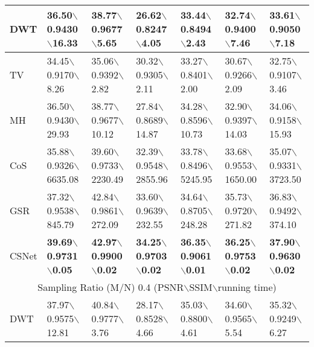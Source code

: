 \documentclass[5pt]{article}
\begin{document}
\begin{table*}[t]
\begin{tabular}{|l|l|l|l|l|l|l|}
DWT & 36.50$\backslash$0.9430$\backslash$16.33 & 38.77$\backslash$0.9677$\backslash$5.65 & 26.62$\backslash$0.8247$\backslash$4.05 & 33.44$\backslash$0.8494$\backslash$2.43 & 32.74$\backslash$0.9400$\backslash$7.46 & 33.61$\backslash$0.9050$\backslash$7.18\\ 
\hline 
TV & 34.45$\backslash$0.9170$\backslash$8.26 & 35.06$\backslash$0.9392$\backslash$2.82 & 30.32$\backslash$0.9305$\backslash$2.11 & 33.27$\backslash$0.8401$\backslash$2.00 & 30.67$\backslash$0.9266$\backslash$2.09 & 32.75$\backslash$0.9107$\backslash$3.46\\ 
\hline 
MH & 36.50$\backslash$0.9430$\backslash$29.93 & 38.77$\backslash$0.9677$\backslash$10.12 & 27.84$\backslash$0.8689$\backslash$14.87 & 34.28$\backslash$0.8596$\backslash$10.73 & 32.90$\backslash$0.9397$\backslash$14.03 & 34.06$\backslash$0.9158$\backslash$15.93\\ 
\hline 
CoS & 35.88$\backslash$0.9326$\backslash$\tiny 6635.08 & 39.60$\backslash$0.9733$\backslash$\tiny 2230.49 & 32.39$\backslash$0.9548$\backslash$\tiny 2855.96 & 33.78$\backslash$0.8496$\backslash$\tiny 5245.95 & 33.68$\backslash$0.9553$\backslash$\tiny 1650.00 & 35.07$\backslash$0.9331$\backslash$\tiny 3723.50\\ 
\hline 
GSR & 37.32$\backslash$0.9538$\backslash$845.79 & 42.84$\backslash$0.9861$\backslash$272.09 & 33.60$\backslash$0.9639$\backslash$232.55 & 34.64$\backslash$0.8705$\backslash$248.28 & 35.73$\backslash$0.9720$\backslash$271.82 & 36.83$\backslash$0.9492$\backslash$374.10\\ 
\hline 
CSNet & \textbf{39.69}$\backslash$\textbf{0.9731}$\backslash$\textbf{0.05} & \textbf{42.97}$\backslash$\textbf{0.9900}$\backslash$\textbf{0.02} & \textbf{34.25}$\backslash$\textbf{0.9703}$\backslash$\textbf{0.02} & \textbf{36.35}$\backslash$\textbf{0.9061}$\backslash$\textbf{0.01} & \textbf{36.25}$\backslash$\textbf{0.9753}$\backslash$\textbf{0.02} & \textbf{37.90}$\backslash$\textbf{0.9630}$\backslash$\textbf{0.02}\\ 
\hline 
\multicolumn{7}{|c|}{Sampling Ratio (M/N) 0.4 (PSNR$\backslash$SSIM$\backslash$running time)}\\
\hline 
DWT & 37.97$\backslash$0.9575$\backslash$12.81 & 40.84$\backslash$0.9777$\backslash$3.76 & 28.17$\backslash$0.8528$\backslash$4.66 & 35.03$\backslash$0.8800$\backslash$4.61 & 34.60$\backslash$0.9565$\backslash$5.54 & 35.32$\backslash$0.9249$\backslash$6.27\\ 

\end{tabular}
\end{table*}
\end{document}
